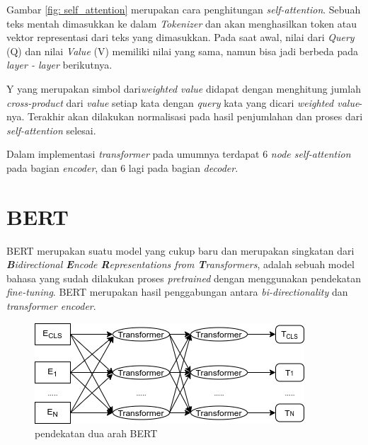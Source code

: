 Gambar \ref{fig: self_attention} merupakan cara penghitungan \textit{self-attention}. Sebuah teks mentah dimasukkan ke dalam \textit{Tokenizer} dan akan menghasilkan token atau vektor representasi dari teks yang dimasukkan. Pada saat awal, nilai dari \textit{Query} (Q) dan nilai \textit{Value} (V) memiliki nilai yang sama, namun bisa jadi berbeda pada \textit{layer - layer} berikutnya.

Y yang merupakan simbol dari\textit{weighted value} didapat dengan menghitung jumlah \textit{cross-product} dari \textit{value} setiap kata dengan \textit{query} kata yang dicari \textit{weighted value}-nya. Terakhir akan dilakukan normalisasi pada hasil penjumlahan dan proses dari \textit{self-attention} selesai.

Dalam implementasi \textit{transformer} pada umumnya terdapat 6 \textit{node self-attention} pada bagian \textit{encoder}, dan 6 lagi pada bagian \textit{decoder}.


\section{BERT}
BERT merupakan suatu model yang cukup baru dan merupakan singkatan dari \textit{\textbf{B}idirectional \textbf{E}ncode \textbf{R}epresentations from \textbf{T}ransformers}, adalah sebuah model bahasa yang sudah dilakukan proses \textit{pretrained} dengan menggunakan pendekatan \textit{fine-tuning}. BERT merupakan hasil penggabungan antara \textit{bi-directionality} dan \textit{transformer encoder}. \cite{devlin2019bert}

\begin{figure}[h]
    \begin{center}
        \includegraphics[width= .8\linewidth]{gambar/bert_archi_base.png}
        \caption{pendekatan dua arah BERT}
        \label{fig: bidirectionalBert}
    \end{center}
\end{figure}

